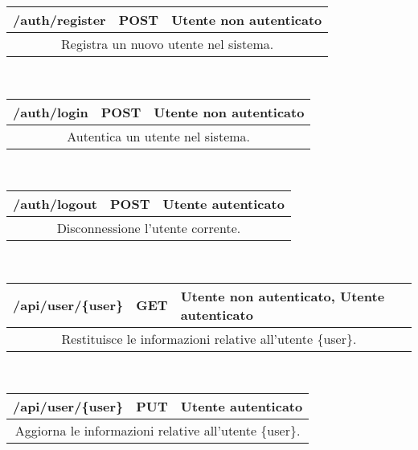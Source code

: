 \begin{table}[h]
	\begin{tabular}{|p{}|p{}|p{}|}
		\toprule
		\textbf{/auth/register} & \textbf{POST} & \textbf{Utente non autenticato} \\ \midrule
		\multicolumn{3}{|c|}{Registra un nuovo utente nel sistema.} \\
		\bottomrule
	\end{tabular}\\
	\par\bigskip
	
	\begin{tabular}{|p{}|p{}|p{}|}
		\toprule
		\textbf{/auth/login} & \textbf{POST} & \textbf{Utente non autenticato} \\ \midrule
		\multicolumn{3}{|c|}{Autentica un utente nel sistema.} \\
		\bottomrule
	\end{tabular}\\
	\par\bigskip
	
	\begin{tabular}{|p{}|p{}|p{}|}
		\toprule
		\textbf{/auth/logout} & \textbf{POST} & \textbf{Utente autenticato} \\ \midrule
		\multicolumn{3}{|c|}{Disconnessione l'utente corrente.} \\
		\bottomrule
	\end{tabular}\\
	\par\bigskip
	
	\begin{tabular}{|p{}|p{}|p{}|}
		\toprule
		\textbf{/api/user/\{user\}} & \textbf{GET} & \textbf{Utente non autenticato, Utente autenticato} \\ \midrule
		\multicolumn{3}{|c|}{Restituisce le informazioni relative all'utente \{user\}.} \\
		\bottomrule
	\end{tabular}\\
	\par\bigskip
	
	\begin{tabular}{|p{}|p{}|p{}|}
		\toprule
		\textbf{/api/user/\{user\}} & \textbf{PUT} & \textbf{Utente autenticato} \\ \midrule
		\multicolumn{3}{|c|}{Aggiorna le informazioni relative all'utente \{user\}.} \\
		\bottomrule
	\end{tabular}\\
	\par\bigskip
		

\end{table}
